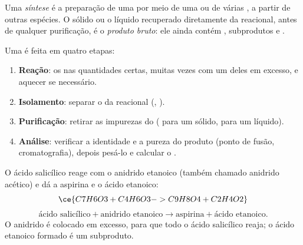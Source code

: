 \begin{definition}\label{def:g10:synthesis-yield:synthesis}
Uma \emph{síntese} é a preparação de uma 
por meio de uma ou de várias , a partir de outras
espécies. O sólido ou o líquido recuperado diretamente da 
reacional, antes de qualquer purificação, é o \emph{produto
bruto}: ele ainda contém , subprodutos e
.
\end{definition}

\begin{method}\label{met:g10:synthesis-yield:plan}
Uma  é feita em quatro etapas:
\begin{enumerate}
  \item \textbf{Reação}:  os  nas quantidades certas,
        muitas vezes com um deles em excesso, e aquecer se necessário.
  \item \textbf{Isolamento}: separar o  da 
        reacional (, ).
  \item \textbf{Purificação}: retirar as impurezas do 
        ( para um sólido,  para um líquido).
  \item \textbf{Análise}: verificar a identidade e a pureza do produto
        (ponto de fusão, cromatografia), depois pesá-lo e calcular o
        .
\end{enumerate}
\end{method}

\begin{example}\label{ex:g10:synthesis-yield:aspirin}
O ácido salicílico reage com o anidrido etanoico (também chamado
anidrido acético) e dá a aspirina e o ácido etanoico:
\[
  \ce{C7H6O3 + C4H6O3 -> C9H8O4 + C2H4O2}
\]
\[
  \text{ácido salicílico} + \text{anidrido etanoico} \longrightarrow
  \text{aspirina} + \text{ácido etanoico}.
\]
O anidrido é colocado em excesso, para que todo o ácido salicílico
reaja; o ácido etanoico formado é um subproduto.
\end{example}

